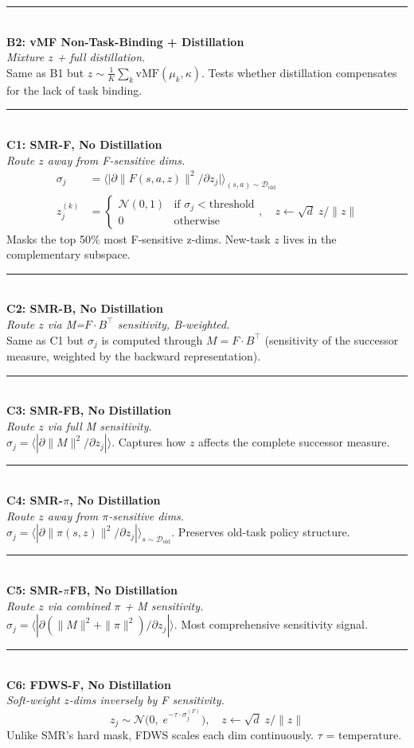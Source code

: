 \documentclass[10pt]{article}
\newcommand{\Dold}{\mathcal{D}_{\text{old}}}
\newcommand{\method}[2]{%
  \noindent\rule{\textwidth}{0.5pt}\\[2pt]
  {\large\textbf{#1}}\\[2pt]
  \textit{#2}\\[3pt]
}
\begin{document}
\method{B2: vMF Non-Task-Binding + Distillation}{Mixture $z$ + full distillation.}
Same as B1 but $z \sim \frac{1}{K}\sum_k \mathrm{vMF}(\mu_k, \kappa)$. Tests whether distillation compensates for the lack of task binding.

\method{C1: SMR-F, No Distillation}{Route $z$ away from F-sensitive dims.}
\vspace{-0.5em}
\begin{align*}
\sigma_j &= \bigl\langle \bigl| \partial \|F(s,a,z)\|^2 / \partial z_j \bigr| \bigr\rangle_{(s,a)\sim\Dold} \\
z^{(k)}_j &= \begin{cases} \mathcal{N}(0,1) & \text{if } \sigma_j < \text{threshold} \\ 0 & \text{otherwise}\end{cases}, \quad z \leftarrow \sqrt{d}\; z / \|z\|
\end{align*}
Masks the top 50\% most F-sensitive z-dims. New-task $z$ lives in the complementary subspace.

\method{C2: SMR-B, No Distillation}{Route $z$ via M=$F{\cdot}B^\top$ sensitivity, B-weighted.}
Same as C1 but $\sigma_j$ is computed through $M = F \cdot B^\top$ (sensitivity of the successor measure, weighted by the backward representation).

\method{C3: SMR-FB, No Distillation}{Route $z$ via full M sensitivity.}
$\sigma_j = \langle |\partial \|M\|^2 / \partial z_j| \rangle$. Captures how $z$ affects the complete successor measure.

\method{C4: SMR-$\pi$, No Distillation}{Route $z$ away from $\pi$-sensitive dims.}
$\sigma_j = \langle |\partial \|\pi(s,z)\|^2 / \partial z_j| \rangle_{s \sim \Dold}$. Preserves old-task policy structure.

\method{C5: SMR-$\pi$FB, No Distillation}{Route $z$ via combined $\pi$ + M sensitivity.}
$\sigma_j = \langle |\partial(\|M\|^2 + \|\pi\|^2) / \partial z_j| \rangle$. Most comprehensive sensitivity signal.

\method{C6: FDWS-F, No Distillation}{Soft-weight $z$-dims inversely by F sensitivity.}
\vspace{-0.5em}
\[
z_j \sim \mathcal{N}\bigl(0,\; e^{-\tau \cdot \sigma_j^{(F)}}\bigr), \quad z \leftarrow \sqrt{d}\; z / \|z\|
\]
Unlike SMR's hard mask, FDWS scales each dim continuously. $\tau$ = temperature.
\end{document}
